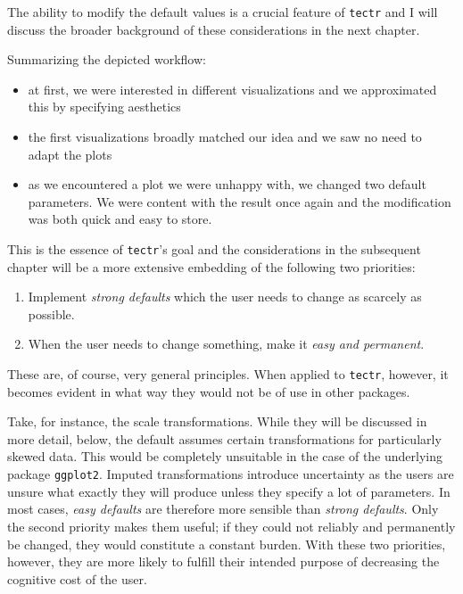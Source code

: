 \documentclass[]{report}
\theoremstyle{definition}
\theoremstyle{definition}
\theoremstyle{definition}
\theoremstyle{remark}
\begin{document}
The ability to modify the default values is a crucial feature of
\texttt{tectr} and I will discuss the broader background of these
considerations in the next chapter.

Summarizing the depicted workflow:

\begin{itemize}
\item
  at first, we were interested in different visualizations and we
  approximated this by specifying aesthetics
\item
  the first visualizations broadly matched our idea and we saw no need
  to adapt the plots
\item
  as we encountered a plot we were unhappy with, we changed two default
  parameters. We were content with the result once again and the
  modification was both quick and easy to store.
\end{itemize}

This is the essence of \texttt{tectr}'s goal and the considerations in
the subsequent chapter will be a more extensive embedding of the
following two priorities:

\begin{enumerate}
\def\labelenumi{\arabic{enumi}.}
\item
  Implement \emph{strong defaults} which the user needs to change as
  scarcely as possible.
\item
  When the user needs to change something, make it \emph{easy and
  permanent}.
\end{enumerate}

These are, of course, very general principles. When applied to
\texttt{tectr}, however, it becomes evident in what way they would not
be of use in other packages.

Take, for instance, the scale transformations. While they will be
discussed in more detail, below, the default assumes certain
transformations for particularly skewed data. This would be completely
unsuitable in the case of the underlying package \texttt{ggplot2}.
Imputed transformations introduce uncertainty as the users are unsure
what exactly they will produce unless they specify a lot of parameters.
In most cases, \emph{easy defaults} are therefore more sensible than
\emph{strong defaults}. Only the second priority makes them useful; if
they could not reliably and permanently be changed, they would
constitute a constant burden. With these two priorities, however, they
are more likely to fulfill their intended purpose of decreasing the
cognitive cost of the user.
\end{document}
